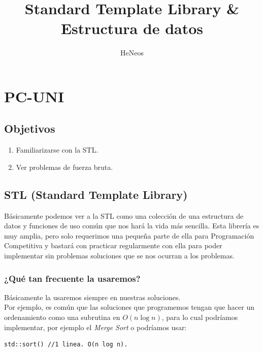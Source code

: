 \documentclass[a4paper,12pt]{article}
\title{Standard Template Library \& Estructura de datos}
\author{HeNeos}
\begin{document}
\maketitle
\section{PC-UNI}
\subsection*{Objetivos}
\begin{enumerate}
\item Familiarizarse con la STL.
\item Ver problemas de fuerza bruta.
\end{enumerate}
\subsection*{STL (Standard Template Library)}
Básicamente podemos ver a la STL como una colección de una estructura de datos y funciones de uso común que nos hará la vida más sencilla. Esta librería es muy amplia, pero solo requerimos una pequeña parte de ella para Programación Competitiva y bastará con practicar regularmente con ella para poder implementar sin problemas soluciones que se nos ocurran a los problemas.
\subsubsection*{¿Qué tan frecuente la usaremos?}
Básicamente la usaremos siempre en nuestras soluciones.\\
Por ejemplo, es común que las soluciones que programemos tengan que hacer un ordenamiento como una subrutina en $O(n\log n)$, para lo cual podríamos implementar, por ejemplo el \textit{Merge Sort} o podríamos usar:
\begin{lstlisting}
std::sort() //1 linea. O(n log n).
\end{lstlisting}
\end{document}
